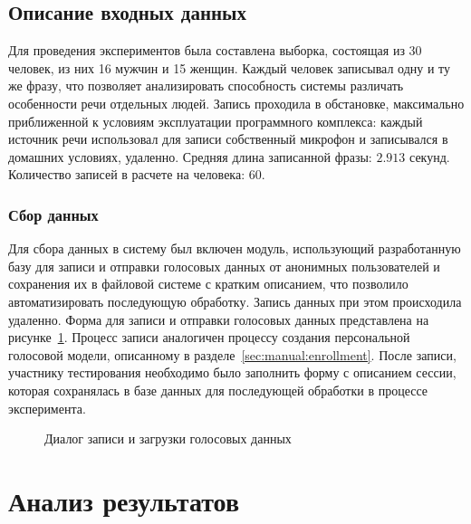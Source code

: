 \subsection{Описание входных данных}

Для проведения экспериментов была составлена выборка, состоящая из 30 человек,
из них 16 мужчин и 15 женщин. Каждый человек записывал одну и ту же фразу, что
позволяет анализировать способность системы различать особенности речи отдельных
людей. Запись проходила в обстановке, максимально приближенной к условиям
эксплуатации программного комплекса: каждый источник речи использовал для записи
собственный микрофон и записывался в домашних условиях, удаленно. Средняя длина
записанной фразы: $2.913$ секунд. Количество записей в расчете на человека:
$60$.

\subsubsection*{Сбор данных}

Для сбора данных в систему был включен модуль, использующий
разработанную базу для записи и отправки голосовых данных от анонимных
пользователей и сохранения их в файловой системе с кратким описанием, что
позволило автоматизировать последующую обработку. Запись данных при этом
происходила удаленно. Форма для записи и отправки голосовых данных представлена
на рисунке~\ref{fig:ui:voice_upload}. Процесс записи аналогичен процессу
создания персональной голосовой модели, описанному в
разделе~\ref{sec:manual:enrollment}. После записи, участнику тестирования
необходимо было заполнить форму с описанием сессии, которая сохранялась в базе
данных для последующей обработки в процессе эксперимента.

\begin{figure}[ht!]
\caption{Диалог записи и загрузки голосовых данных}
\label{fig:ui:voice_upload}
\end{figure}

\section{Анализ результатов}



